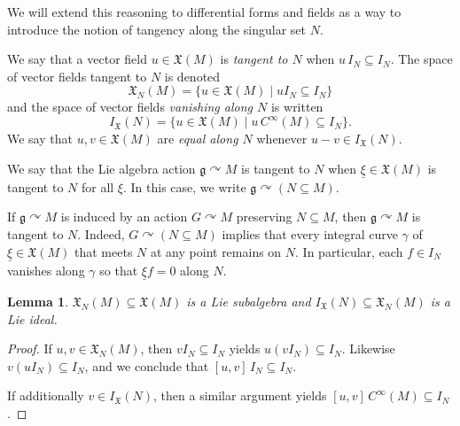 \documentclass[pdftex]{sigma}
\numberwithin{equation}{section}
\newtheorem{Lemma}[Theorem]{Lemma}
\newcommand{\g}{\mathfrak{g}}
\newcommand{\tgtvf}{\mathfrak X_N(M)}
\newcommand{\X}{\mathfrak{X}}
\renewcommand{\subset}{\subseteq}
\begin{document}
We will extend this reasoning to differential forms and fields as a way to introduce the notion of tangency along the singular set $N$.



\begin{Definition}\label{def:tangentvf}
	We say that a vector field $u \in \mathfrak{X}(M)$ is \emph{tangent to $N$} when $u\, I_N\subset I_N$. The space of vector fields tangent to $N$ is denoted
	\begin{displaymath}
		\mathfrak{X}_N(M) =
		\lbrace
		u \in \mathfrak{X}(M)
		\mid
		u  I_N \subset I_N
		\rbrace
	\end{displaymath}	
	and the space of vector fields \emph{vanishing along $N$} is written
	\begin{displaymath}
		I_{\mathfrak{X}}(N) =
		\lbrace
		u \in \mathfrak{X}(M)
		\mid
		u \, C^\infty(M) \subset I_N
		\rbrace.
	\end{displaymath}
	We say that $u,v\in\X(M)$ are \emph{equal along $N$} whenever $u-v\in I_\X(N)$.
\end{Definition}

\begin{Definition}\label{def:Lie_algebra_action_tangent_to_N}
	We say that the Lie algebra action $\g\curvearrowright M$ is tangent to $N$ when $\underline\xi\in\X(M)$ is tangent to $N$ for all $\xi$. In this case, we write $\g\curvearrowright(N\subset M)$.
\end{Definition}

\begin{Remark}\label{rem:group_preservation_is_sufficient_for_tangency}
	If $\g\curvearrowright M$ is induced by an action $G\curvearrowright M$ preserving $N\subset M$, then $\g\curvearrowright M$ is tangent to $N$. Indeed, $G\curvearrowright(N\subset M)$ implies that every integral curve $\gamma$ of $\underline\xi\in\X(M)$ that meets $N$ at any point remains on $N$. In particular, each $f\in I_N$ vanishes along $\gamma$ so that $\underline\xi f=0$ along $N$.
\end{Remark}

\begin{Lemma}\label{lem:tangent_to_N_Lie_subalgebra}
	$\tgtvf\subset \X(M)$ is a Lie subalgebra and $I_{\mathfrak{X}}(N)\subset\X_N(M)$ is a Lie ideal.
\end{Lemma}

\begin{proof}
	If $u,v\in\X_N(M)$, then $v I_N\subset I_N$ yields $u(vI_N)\subset I_N$. Likewise $v(uI_N)\subset I_N$, and we conclude that $[u,v]\,I_N\subset I_N$.

	If additionally $v\in I_\X(N)$, then a similar argument yields $[u,v]\,C^\infty(M)\subset I_N$.
\end{proof}
\end{document}
